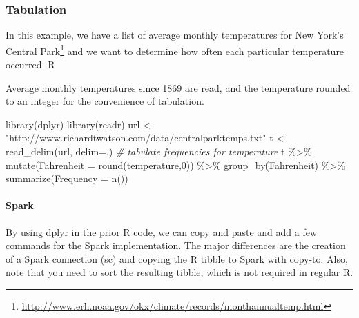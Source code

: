 \documentclass[
]{article}
\newenvironment{Shaded}{\begin{snugshade}}{\end{snugshade}}
\newcommand{\AttributeTok}[1]{\textcolor[rgb]{0.77,0.63,0.00}{#1}}
\newcommand{\CommentTok}[1]{\textcolor[rgb]{0.56,0.35,0.01}{\textit{#1}}}
\newcommand{\DecValTok}[1]{\textcolor[rgb]{0.00,0.00,0.81}{#1}}
\newcommand{\FunctionTok}[1]{\textcolor[rgb]{0.00,0.00,0.00}{#1}}
\newcommand{\NormalTok}[1]{#1}
\newcommand{\OtherTok}[1]{\textcolor[rgb]{0.56,0.35,0.01}{#1}}
\newcommand{\SpecialCharTok}[1]{\textcolor[rgb]{0.00,0.00,0.00}{#1}}
\newcommand{\StringTok}[1]{\textcolor[rgb]{0.31,0.60,0.02}{#1}}
\begin{document}
\hypertarget{tabulation}{%
\subsubsection*{Tabulation}\label{tabulation}}

In this example, we have a list of average monthly temperatures for New
York's Central Park\footnote{\href{http://www.erh.noaa.gov/okx/climate/records/monthannualtemp.html}{\underline{http://www.erh.noaa.gov/okx/climate/records/monthannualtemp.html}}} and we want to determine how
often each particular temperature occurred. R

Average monthly temperatures since 1869 are read, and the temperature
rounded to an integer for the convenience of tabulation.

\begin{Shaded}
\begin{Highlighting}[]
\FunctionTok{library}\NormalTok{(dplyr)}
\FunctionTok{library}\NormalTok{(readr)}
\NormalTok{url }\OtherTok{\textless{}{-}}  \StringTok{"http://www.richardtwatson.com/data/centralparktemps.txt"}
\NormalTok{t }\OtherTok{\textless{}{-}} \FunctionTok{read\_delim}\NormalTok{(url, }\AttributeTok{delim=}\StringTok{\textquotesingle{},\textquotesingle{}}\NormalTok{)}
\CommentTok{\# tabulate frequencies for temperature}
\NormalTok{t }\SpecialCharTok{\%\textgreater{}\%} 
  \FunctionTok{mutate}\NormalTok{(}\AttributeTok{Fahrenheit =} \FunctionTok{round}\NormalTok{(temperature,}\DecValTok{0}\NormalTok{)) }\SpecialCharTok{\%\textgreater{}\%} 
  \FunctionTok{group\_by}\NormalTok{(Fahrenheit) }\SpecialCharTok{\%\textgreater{}\%}
  \FunctionTok{summarize}\NormalTok{(}\AttributeTok{Frequency =} \FunctionTok{n}\NormalTok{())}
\end{Highlighting}
\end{Shaded}

\hypertarget{spark-1}{%
\paragraph*{Spark}\label{spark-1}}

By using dplyr in the prior R code, we can copy and paste and add a few
commands for the Spark implementation. The major differences are the
creation of a Spark connection (sc) and copying the R tibble to Spark
with copy-to. Also, note that you need to sort the resulting tibble,
which is not required in regular R.
\end{document}
